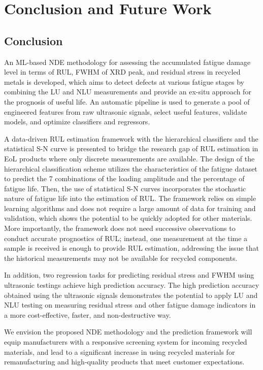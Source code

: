 \chapter{Conclusion and Future Work}
\label{chap: concl}

\section{Conclusion}
An ML-based NDE methodology for assessing the accumulated fatigue damage level in terms of RUL, FWHM of XRD peak, and residual stress in recycled metals is developed, which aims to detect defects at various fatigue stages by combining the LU and NLU measurements and provide an ex-situ approach for the prognosis of useful life. An automatic pipeline is used to generate a pool of engineered features from raw ultrasonic signals, select useful features, validate models, and optimize classifiers and regressors. 

A data-driven RUL estimation framework with the hierarchical classifiers and the statistical S-N curve is presented to bridge the research gap of RUL estimation in EoL products where only discrete measurements are available. The design of the hierarchical classification scheme utilizes the characteristics of the fatigue dataset to predict the 7 combinations of the loading amplitude and the percentage of fatigue life. Then, the use of statistical S-N curves incorporates the stochastic nature of fatigue life into the estimation of RUL. The framework relies on simple learning algorithms and does not require a large amount of data for training and validation, which shows the potential to be quickly adopted for other materials. More importantly, the framework does not need successive observations to conduct accurate prognostics of RUL; instead, one measurement at the time a sample is received is enough to provide RUL estimation, addressing the issue that the historical measurements may not be available for recycled components.

In addition, two regression tasks for predicting residual stress and FWHM using ultrasonic testings achieve high prediction accuracy. The high prediction accuracy obtained using the ultrasonic signals demonstrates the potential to apply LU and NLU testing on measuring residual stress and other fatigue damage indicators in a more cost-effective, faster, and non-destructive way.

We envision the proposed NDE methodology and the prediction framework will equip manufacturers with a responsive screening system for incoming recycled materials, and lead to a significant increase in using recycled materials for remanufacturing and high‐quality products that meet customer expectations.

